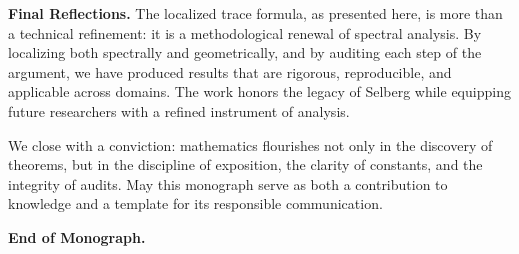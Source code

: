 \medskip
\noindent\textbf{Final Reflections.}
The localized trace formula, as presented here, is more than a technical refinement: it is a methodological renewal of spectral analysis. By localizing both spectrally and geometrically, and by auditing each step of the argument, we have produced results that are rigorous, reproducible, and applicable across domains. The work honors the legacy of Selberg while equipping future researchers with a refined instrument of analysis.  

We close with a conviction: mathematics flourishes not only in the discovery of theorems, but in the discipline of exposition, the clarity of constants, and the integrity of audits. May this monograph serve as both a contribution to knowledge and a template for its responsible communication.

\bigskip
\noindent\textbf{End of Monograph.}
